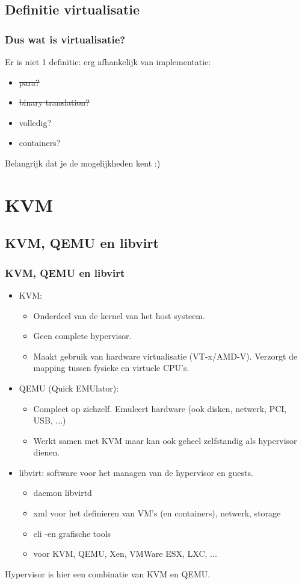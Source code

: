 \subsection {Definitie virtualisatie}
\begin{styleframe}
    \frametitle{Dus wat is virtualisatie?}
\pause
Er is niet 1 definitie: erg afhankelijk van implementatie:
\pause
\begin{itemize}
	\item \sout{para?}
	\item \sout{binary translation?}
	\item volledig?
	\item containers?
\end{itemize}
\pause
Belangrijk dat je de mogelijkheden kent :)
\end{styleframe}

\section{KVM}
\subsection {KVM, QEMU en libvirt}
\begin{styleframe}
    \frametitle{KVM, QEMU en libvirt}
{\scriptsize
\begin{itemize}
	\item KVM:
		\begin{itemize}
			\item Onderdeel van de kernel van het host systeem.
			\pause
			\item Geen complete hypervisor.
			\pause
			\item Maakt gebruik van hardware virtualisatie (VT-x/AMD-V). Verzorgt de mapping tussen fysieke en virtuele CPU's.
			\pause
		\end{itemize}
	\item QEMU (Quick EMUlator):
		\begin{itemize}
			\item Compleet op zichzelf. Emuleert hardware (ook disken, netwerk, PCI, USB, ...)
			\pause
			\item Werkt samen met KVM maar kan ook geheel zelfstandig als hypervisor dienen.
			\pause
		\end{itemize}
	\item libvirt: software voor het managen van de hypervisor en guests.
		\begin{itemize}
			\item daemon libvirtd
			\pause
			\item xml voor het definieren van VM's (en containers), netwerk, storage
			\pause
			\item cli -en grafische tools
			\pause
			\item voor KVM, QEMU, Xen, VMWare ESX, LXC, ...
			\pause
		\end{itemize}
\end{itemize}
Hypervisor is hier een combinatie van KVM en QEMU.
}
\end{styleframe}


